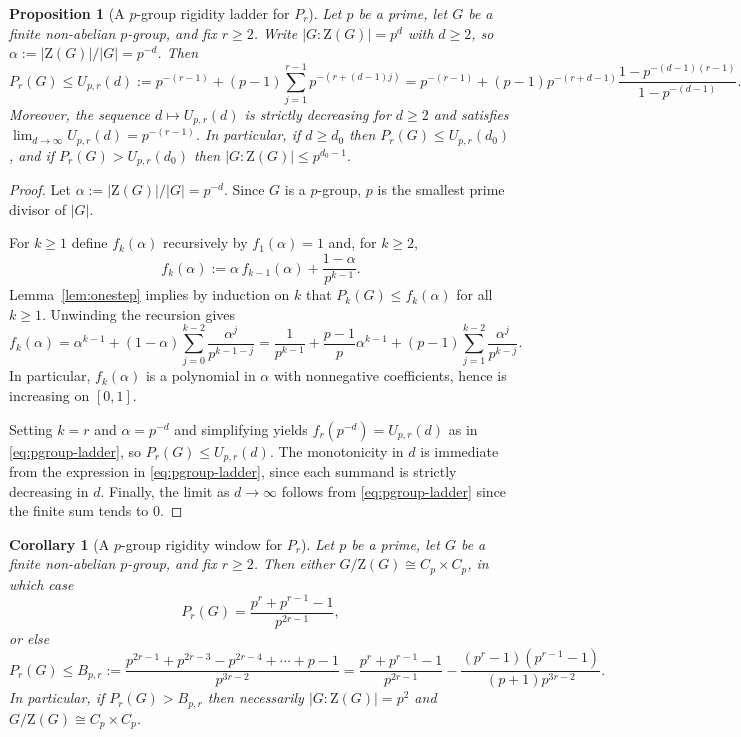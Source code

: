 \documentclass[11pt]{article}
\newtheorem{proposition}[theorem]{Proposition}
\newtheorem{corollary}[theorem]{Corollary}
\theoremstyle{definition}
\theoremstyle{remark}
\theoremstyle{definition}
\theoremstyle{plain}
\newcommand{\Z}{\mathrm{Z}}
\begin{document}
\begin{proposition}[A $p$-group rigidity ladder for $P_r$]\label{prop:pgroup-ladder-Pr}
Let $p$ be a prime, let $G$ be a finite non-abelian $p$-group, and fix $r\ge 2$.
Write $|G:\Z(G)|=p^d$ with $d\ge 2$, so $\alpha:=|\Z(G)|/|G|=p^{-d}$.
Then
\begin{equation}\label{eq:pgroup-ladder}
P_r(G)\le U_{p,r}(d):=p^{-(r-1)}+(p-1)\sum_{j=1}^{r-1}p^{-(r+(d-1)j)}
=p^{-(r-1)}+(p-1)p^{-(r+d-1)}\frac{1-p^{-(d-1)(r-1)}}{1-p^{-(d-1)}}.
\end{equation}
Moreover, the sequence $d\mapsto U_{p,r}(d)$ is strictly decreasing for $d\ge 2$ and satisfies
$\lim_{d\to\infty}U_{p,r}(d)=p^{-(r-1)}$.
In particular, if $d\ge d_0$ then $P_r(G)\le U_{p,r}(d_0)$, and if $P_r(G)>U_{p,r}(d_0)$ then
$|G:\Z(G)|\le p^{d_0-1}$.
\end{proposition}

\begin{proof}
Let $\alpha:=|\Z(G)|/|G|=p^{-d}$.
Since $G$ is a $p$-group, $p$ is the smallest prime divisor of $|G|$.

For $k\ge 1$ define $f_k(\alpha)$ recursively by $f_1(\alpha)=1$ and, for $k\ge 2$,
\[
f_k(\alpha):=\alpha\,f_{k-1}(\alpha)+\frac{1-\alpha}{p^{k-1}}.
\]
Lemma~\ref{lem:onestep} implies by induction on $k$ that $P_k(G)\le f_k(\alpha)$ for all $k\ge 1$.
Unwinding the recursion gives
\[
f_k(\alpha)=\alpha^{k-1}+(1-\alpha)\sum_{j=0}^{k-2}\frac{\alpha^{j}}{p^{k-1-j}}
=\frac{1}{p^{k-1}}+\frac{p-1}{p}\alpha^{k-1}+(p-1)\sum_{j=1}^{k-2}\frac{\alpha^{j}}{p^{k-j}}.
\]
In particular, $f_k(\alpha)$ is a polynomial in $\alpha$ with nonnegative coefficients, hence is increasing on $[0,1]$.

Setting $k=r$ and $\alpha=p^{-d}$ and simplifying yields $f_r(p^{-d})=U_{p,r}(d)$ as in \eqref{eq:pgroup-ladder},
so $P_r(G)\le U_{p,r}(d)$.
The monotonicity in $d$ is immediate from the expression in \eqref{eq:pgroup-ladder}, since each summand is strictly decreasing in $d$.
Finally, the limit as $d\to\infty$ follows from \eqref{eq:pgroup-ladder} since the finite sum tends to $0$.
\end{proof}

\begin{corollary}[A $p$-group rigidity window for $P_r$]\label{cor:pgroup-gap-Pr}
Let $p$ be a prime, let $G$ be a finite non-abelian $p$-group, and fix $r\ge 2$.
Then either $G/\Z(G)\cong C_p\times C_p$, in which case
\[
P_r(G)=\frac{p^r+p^{r-1}-1}{p^{2r-1}},
\]
or else
\begin{equation}\label{eq:pgroup-gap-Pr}
P_r(G)\le B_{p,r}:=\frac{p^{2r-1}+p^{2r-3}-p^{2r-4}+\cdots+p-1}{p^{3r-2}}
=\frac{p^r+p^{r-1}-1}{p^{2r-1}}-\frac{(p^r-1)(p^{r-1}-1)}{(p+1)p^{3r-2}}.
\end{equation}
In particular, if $P_r(G)>B_{p,r}$ then necessarily $|G:\Z(G)|=p^2$ and $G/\Z(G)\cong C_p\times C_p$.
\end{corollary}
\end{document}

